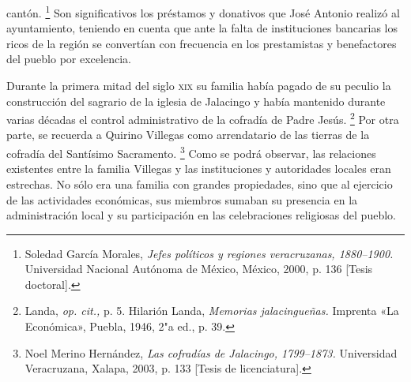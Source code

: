 \documentclass[14pt,twoside,final]{extbook} %
\let\oldfootnote\footnote
\renewcommand\footnote[1]{%
\oldfootnote{\hspace{1mm}#1}}
\begin{document}
cantón.\footnote{Soledad García Morales, \emph{Jefes políticos y regiones veracruzanas, 1880--1900.} Universidad Nacional Autónoma de México, México, 2000, p. 136 [Tesis doctoral].} Son significativos los préstamos y donativos que José Antonio realizó al ayuntamiento, teniendo en cuenta que ante la falta de instituciones bancarias los ricos de la región se convertían con frecuencia en los prestamistas y benefactores del pueblo por excelencia.

Durante la primera mitad del siglo \textsc{xix} su familia había pagado de su peculio la construcción del sagrario de la iglesia de Jalacingo y había mantenido durante varias décadas el control administrativo de la cofradía de Padre Jesús.\footnote{Landa, \emph{op. cit.,} p. 5. Hilarión Landa, \emph{Memorias jalacingueñas.} Imprenta «La Económica», Puebla, 1946, 2"a ed., p. 39.} Por otra parte, se recuerda a Quirino Villegas como arrendatario de las tierras de la cofradía del Santísimo Sacramento.\footnote{Noel Merino Hernández, \emph{Las cofradías de Jalacingo, 1799--1873.} Universidad Veracruzana, Xalapa, 2003, p. 133 [Tesis de licenciatura].} Como se podrá observar, las relaciones existentes entre la familia Villegas y las instituciones y autoridades locales eran estrechas. No sólo era una familia con grandes propiedades, sino que al ejercicio de las actividades económicas, sus miembros sumaban su presencia en la administración local y su participación en las celebraciones religiosas del pueblo.
\end{document}

